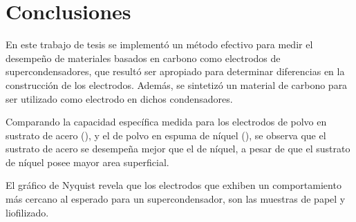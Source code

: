 \chapter{Conclusiones}
En este trabajo de tesis se implementó un método efectivo para medir el desempeño de materiales basados en carbono como electrodos de supercondensadores, que resultó ser apropiado para determinar diferencias en la construcción de los electrodos. Además, se sintetizó un material de carbono para ser utilizado como electrodo en dichos condensadores.

Comparando la capacidad específica medida para los electrodos de polvo en sustrato de acero (\mPolvoAcero), y el de polvo en espuma de níquel (\mPolvoNiquel), se observa que el sustrato de acero se desempeña mejor que el de níquel, a pesar de que el sustrato de níquel posee mayor area superficial.

El gráfico de Nyquist revela que los electrodos que exhiben un comportamiento más cercano al esperado para un supercondensador, son las 
muestras de papel y liofilizado.
